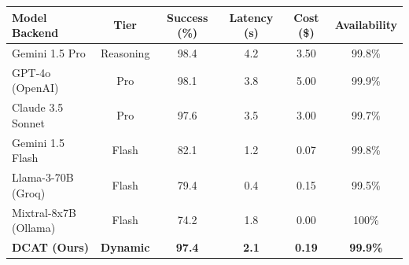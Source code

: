 \begin{tabular}{l c c c c c}
\toprule
\textbf{Model Backend} & \textbf{Tier} & \textbf{Success (\%)} & \textbf{Latency (s)} & \textbf{Cost (\$)} & \textbf{Availability} \\
\midrule
Gemini 1.5 Pro & Reasoning & 98.4 & 4.2 & 3.50 & 99.8\% \\
GPT-4o (OpenAI) & Pro & 98.1 & 3.8 & 5.00 & 99.9\% \\
Claude 3.5 Sonnet & Pro & 97.6 & 3.5 & 3.00 & 99.7\% \\
\midrule
Gemini 1.5 Flash & Flash & 82.1 & 1.2 & 0.07 & 99.8\% \\
Llama-3-70B (Groq) & Flash & 79.4 & 0.4 & 0.15 & 99.5\% \\
Mixtral-8x7B (Ollama) & Flash & 74.2 & 1.8 & 0.00 & 100\% \\
\midrule
\rowcolor{blue!5}
\textbf{DCAT (Ours)} & \textbf{Dynamic} & \textbf{97.4} & \textbf{2.1} & \textbf{0.19} & \textbf{99.9\%} \\
\bottomrule
\end{tabular}
